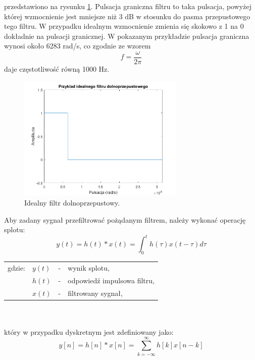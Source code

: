przedstawiono na rysunku \ref{rys:sub_lowpass}. Pulsacja graniczna filtru to taka pulsacja, powyżej której wzmocnienie jest mniejsze niż 3 dB w stosunku do pasma przepustowego tego filtru. W przypadku idealnym wzmocnienie zmienia się skokowo z 1 na 0 dokładnie na pulsacji granicznej. W pokazanym przykładzie pulsacja graniczna wynosi około 6283 rad/s, co zgodnie ze wzorem
\begin{equation} \label{equ:sub_frequency}
f = \frac{\omega}{2 \pi}
\end{equation}
daje częstotliwość równą 1000 Hz.
\begin{figure}[H]
	\centering
	\includegraphics[width=8cm]{grafiki/sub_lowpass}
	\captionsetup{justification=centering}
	\caption{Idealny filtr dolnoprzepustowy.}
	\label{rys:sub_lowpass}
\end{figure}

Aby zadany sygnał przefiltrować pożądanym filtrem, należy wykonać operację splotu:
\begin{equation} \label{equ:sub_splot}
y(t)= h(t)*x(t) = \int_{0}^{t} h(\tau)x(t-\tau)d\tau
\end{equation}
\begin{tabular}{ l l l l}
	gdzie: & $y(t)$ &  - & wynik splotu, \\
	&	$h(t)$ & - &  odpowiedź impulsowa filtru,\\
	&	$x(t)$ & - &  filtrowany sygnał,\\
	
\end{tabular} \\ \\
który w przypadku dyskretnym jest zdefiniowany jako:
\begin{equation} \label{equ:sub_splot_dyskretny}
y[n]= h[n]*x[n] = \sum_{k=-\infty}^{\infty} h[k]x[n-k]
\end{equation}

